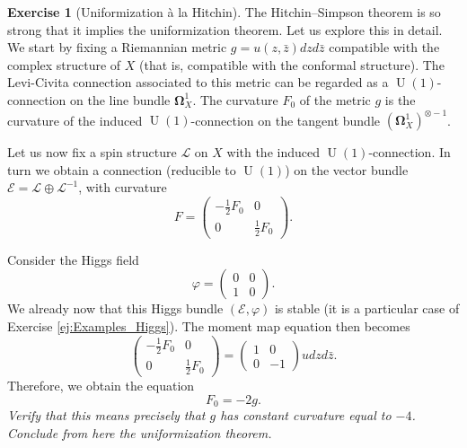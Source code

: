 \documentclass[12pt,a4paper]{amsbook}
\theoremstyle{remark} \newtheorem{rmk}[thm]{Remark}
\theoremstyle{definition} \newtheorem{defn}[thm]{Definition}
\theoremstyle{definition} \newtheorem{ex}[thm]{Example}
\theoremstyle{definition} \newtheorem{ej}{Exercise}
\newcommand{\cL}{\mathcal L}
\newcommand{\sE}{\mathscr E}
\newcommand{\sL}{\mathscr L}
\DeclareMathOperator{\U}{U}
\begin{document}
\begin{ej}[Uniformization à la Hitchin] \label{ej:hitchin_unif}
The Hitchin--Simpson theorem is so strong that it implies the uniformization theorem. Let us explore this in detail. We start by fixing a Riemannian metric $g=u(z,\bar{z}) dz d\bar{z}$ compatible with the complex structure of $X$  (that is, compatible with the conformal structure). The Levi-Civita connection associated to this metric can be regarded as a $\U(1)$-connection on the line bundle $\bm{\Omega}^1_X$. The curvature $F_0$ of the metric $g$ is the curvature of the induced $\U(1)$-connection on the tangent bundle $(\bm{\Omega}^1_X)^{\otimes -1}$.

Let us now fix a spin structure $\sL$ on $X$ with the induced $\U(1)$-connection. In turn we obtain a connection (reducible to $\U(1)$) on the vector bundle $\sE=\cL \oplus \cL^{-1}$, with curvature
\begin{equation*}
F =
\begin{pmatrix}
-\tfrac{1}{2} F_0 & 0 \\
0 &\tfrac{1}{2} F_0
\end{pmatrix}.
\end{equation*}

Consider the Higgs field
 \begin{equation*}
\varphi =
\begin{pmatrix}
0 & 0 \\
1 & 0
\end{pmatrix}.
\end{equation*}
We already now that this Higgs bundle $(\sE,\varphi)$ is stable (it is a particular case of Exercise \ref{ej:Examples_Higgs}). The moment map equation then becomes
\begin{equation*}
\begin{pmatrix}
-\tfrac{1}{2} F_0 & 0 \\
0 &\tfrac{1}{2} F_0
\end{pmatrix}=
\begin{pmatrix}
1 & 0 \\
0 & -1
\end{pmatrix}u dz d\bar{z}
.
\end{equation*}
Therefore, we obtain the equation
\begin{equation*}
F_0 = -2 g.
\end{equation*}
\textit{Verify that this means precisely that $g$ has constant curvature equal to  $-4$. Conclude from here the uniformization theorem.}
\end{ej}
\end{document}
